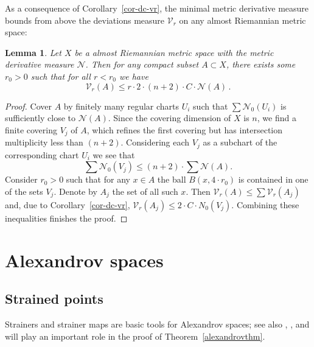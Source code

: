 \documentclass[12pt,leqno,intlimits]{amsart}
\numberwithin{equation}{section}
\newtheorem{lem}[thm]{Lemma}
\theoremstyle{definition}
\theoremstyle{remark}
\newcommand{\tref}[1]{Theorem~\ref{#1}}
\newcommand{\cref}[1]{Corollary~\ref{#1}}
\begin{document}
As a consequence of \cref{cor-dc-vr}, the minimal metric derivative measure bounds from above the deviations measure $\mathcal{V}_r$
on any almost Riemannian metric space:

\begin{lem} \label{cor-mu-dc}
Let $X$ be a almost Riemannian metric space with the metric derivative measure $\mathcal N$.
Then for any compact subset $A\subset X$, there exists some $r_0>0$ such that for all
$r<r_0$ we have
$$\mathcal{V}_r (A) \leq r\cdot 2\cdot  (n+2)\cdot C\cdot \mathcal N (A)\,. $$
\end{lem}

\begin{proof}
Cover $A$ by finitely many regular charts $U_i$ such that $\sum \mathcal N_0 (U_i)$ is sufficiently close to $\mathcal N (A)$.
Since the covering dimension of $X$ is $n$, we find a finite covering $V_j$ of $A$, which refines the first covering but has intersection multiplicity less than $(n+2)$. Considering each $V_j$ as a subchart of the corresponding chart $U_i$ we see that
$$\sum \mathcal N_0 (V_j) \leq (n+2)\cdot \sum \mathcal N(A)  .$$
Consider $r_0>0$ such that for any $x\in A$ the ball $B (x,{4{\cdot}r_0})$ is contained in one of the sets $V_j$. Denote by $A_j$ the set of all such $x$.
Then $\mathcal{V}_r (A) \leq \sum \mathcal{V}_r (A_j)$ and, due to \cref{cor-dc-vr}, $\mathcal{V}_r (A_j) \leq 2 \cdot C\cdot N_0 (V_j)$.
Combining these inequalities finishes the proof.
\end{proof}

\section{Alexandrov spaces} \label{sec:Alex}
\subsection{Strained points} \label{subsec:strainer}
Strainers and strainer maps are basic tools for Alexandrov spaces; see also \cite{BGP}, \cite{Otsu-Shioya}, \cite{Shioya} and will play an important role in the proof of \tref{alexandrovthm}.
\end{document}
